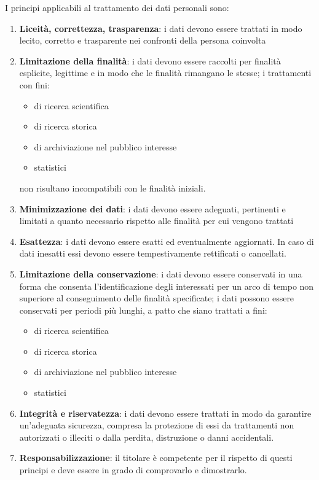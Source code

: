 I principi applicabili al trattamento dei dati personali sono:
\begin{enumerate}
    \item \textbf{Liceità, correttezza, trasparenza}: i dati devono essere trattati in modo lecito, corretto e trasparente nei confronti della persona coinvolta
    \item \textbf{Limitazione della finalità}: i dati devono essere raccolti per finalità esplicite, legittime e in modo che le finalità rimangano le stesse; i trattamenti con fini:
    \begin{itemize}
        \item di ricerca scientifica
        \item di ricerca storica
        \item di archiviazione nel pubblico interesse
        \item statistici
    \end{itemize}
    non risultano incompatibili con le finalità iniziali.

    \item \textbf{Minimizzazione dei dati}: i dati devono essere adeguati, pertinenti e limitati a quanto necessario rispetto alle finalità per cui vengono trattati

    \item \textbf{Esattezza}: i dati devono essere esatti ed eventualmente aggiornati.
    In caso di dati inesatti essi devono essere tempestivamente rettificati o cancellati.

    \item \textbf{Limitazione della conservazione}: i dati devono essere conservati in una forma che consenta l'identificazione degli interessati per un arco di tempo non superiore al conseguimento delle finalità specificate; i dati possono essere conservati per periodi più lunghi, a patto che siano trattati a fini:
    \begin{itemize}
        \item di ricerca scientifica
        \item di ricerca storica
        \item di archiviazione nel pubblico interesse
        \item statistici
    \end{itemize}

    \item \textbf{Integrità e riservatezza}: i dati devono essere trattati in modo da garantire un'adeguata sicurezza, compresa la protezione di essi da trattamenti non autorizzati o illeciti o dalla perdita, distruzione o danni accidentali.

    \item \textbf{Responsabilizzazione}: il titolare è competente per il rispetto di questi principi e deve essere in grado di comprovarlo e dimostrarlo.
\end{enumerate}

